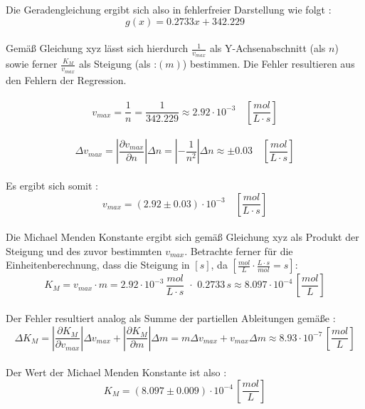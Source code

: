 Die Geradengleichung ergibt sich also in fehlerfreier Darstellung wie folgt : 
\begin{equation}
g(x) = 0.2733 x + 342.229
\label{Geradengleichung}
\end{equation}\\
Gemäß Gleichung xyz lässt sich hierdurch $\frac{1}{v_{max}}$ als Y-Achsenabschnitt (als $n$) sowie ferner $\frac{K_M}{v_{max}}$ als Steigung (als :$(m)$) bestimmen. Die Fehler resultieren aus den Fehlern der Regression.\\
\\
\begin{equation}
v_{max} = \frac{1}{n} = \frac{1}{342.229} \approx 2.92\cdot 10^{-3} \quad [\si{\frac{mol}{L\cdot s}}]
\end{equation}
\\
\begin{equation}
\Delta v_{max} = |\frac{\partial v_{max}}{\partial n}|\Delta n = |-\frac{1}{n^2}|\Delta n \approx \pm 0.03  \quad [\si{\frac{mol}{L\cdot s}}]
\end{equation}
\\
Es ergibt sich somit : 
\begin{equation}
v_{max} = (2.92 \pm 0.03 )\cdot 10^{-3}  \quad [\si{\frac{mol}{L\cdot s}}]
\end{equation}\\
Die Michael Menden Konstante ergibt sich gemäß Gleichung xyz als Produkt der Steigung und des zuvor bestimmten $v_{max}$. Betrachte ferner für die Einheitenberechnung, dass die Steigung in $  [\si{s}]$, da $ [\si{\frac{mol}{L}\cdot \frac{L\cdot s}{mol} = s}]$: 
\begin{equation}
K_M = v_{max} \cdot m = 2.92 \cdot 10^{-3} \, \si{\frac{mol}{L\cdot s}}\,\, \cdot \,\,0.2733  \,\si{s} \approx 8.097 \cdot 10^{-4} \, [\si{\frac{mol}{L}}]
\end{equation}\\
Der Fehler resultiert analog als Summe der partiellen Ableitungen gemäße : 
\begin{equation}
\Delta K_M = |\frac{\partial K_M}{\partial v_{max}}|\Delta v_{max} + |\frac{\partial K_M}{\partial m}|\Delta m  = m \Delta v_{max} + v_{max}\Delta m \approx 8.93 \cdot 10^{-7} \,[\si{\frac{mol}{L}}]
\end{equation}\\
Der Wert der Michael Menden Konstante ist also : 
\begin{equation}
K_M = (8.097 \pm 0.009) \cdot 10^{-4} \,[\si{\frac{mol}{L}}]
\end{equation}\\
